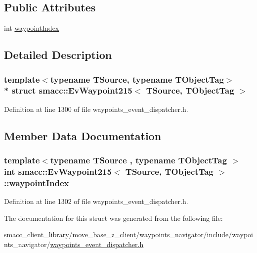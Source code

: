 \subsection*{Public Attributes}
\begin{DoxyCompactItemize}
\item 
int \hyperlink{structsmacc_1_1EvWaypoint215_a74a80262ba7b102587d0f24543de5e49}{waypoint\+Index}
\end{DoxyCompactItemize}


\subsection{Detailed Description}
\subsubsection*{template$<$typename T\+Source, typename T\+Object\+Tag$>$\\*
struct smacc\+::\+Ev\+Waypoint215$<$ T\+Source, T\+Object\+Tag $>$}



Definition at line 1300 of file waypoints\+\_\+event\+\_\+dispatcher.\+h.



\subsection{Member Data Documentation}
\subsubsection[{\texorpdfstring{waypoint\+Index}{waypointIndex}}]{\setlength{\rightskip}{0pt plus 5cm}template$<$typename T\+Source , typename T\+Object\+Tag $>$ int {\bf smacc\+::\+Ev\+Waypoint215}$<$ T\+Source, T\+Object\+Tag $>$\+::waypoint\+Index}\hypertarget{structsmacc_1_1EvWaypoint215_a74a80262ba7b102587d0f24543de5e49}{}\label{structsmacc_1_1EvWaypoint215_a74a80262ba7b102587d0f24543de5e49}


Definition at line 1302 of file waypoints\+\_\+event\+\_\+dispatcher.\+h.



The documentation for this struct was generated from the following file\+:\begin{DoxyCompactItemize}
\item 
smacc\+\_\+client\+\_\+library/move\+\_\+base\+\_\+z\+\_\+client/waypoints\+\_\+navigator/include/waypoints\+\_\+navigator/\hyperlink{waypoints__event__dispatcher_8h}{waypoints\+\_\+event\+\_\+dispatcher.\+h}\end{DoxyCompactItemize}

